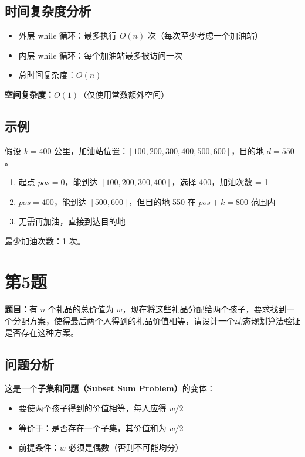 \documentclass[UTF8,12pt,a4paper]{ctexart}
\begin{document}
\subsection*{时间复杂度分析}

\begin{itemize}
	\item 外层 while 循环：最多执行 $O(n)$ 次（每次至少考虑一个加油站）
	\item 内层 while 循环：每个加油站最多被访问一次
	\item 总时间复杂度：$O(n)$
\end{itemize}

\textbf{空间复杂度：}$O(1)$（仅使用常数额外空间）

\subsection*{示例}

假设 $k = 400$ 公里，加油站位置：$[100, 200, 300, 400, 500, 600]$，目的地 $d = 550$。

\begin{enumerate}
	\item 起点 $pos = 0$，能到达 $[100, 200, 300, 400]$，选择 400，加油次数 = 1
	\item $pos = 400$，能到达 $[500, 600]$，但目的地 550 在 $pos + k = 800$ 范围内
	\item 无需再加油，直接到达目的地
\end{enumerate}

最少加油次数：1 次。


\section*{第5题}
\textbf{题目：}有 $n$ 个礼品的总价值为 $w$，现在将这些礼品分配给两个孩子，要求找到一个分配方案，使得最后两个人得到的礼品价值相等，请设计一个动态规划算法验证是否存在这种方案。

\subsection*{问题分析}

这是一个\textbf{子集和问题（Subset Sum Problem）}的变体：
\begin{itemize}
	\item 要使两个孩子得到的价值相等，每人应得 $w/2$
	\item 等价于：是否存在一个子集，其价值和为 $w/2$
	\item 前提条件：$w$ 必须是偶数（否则不可能均分）
\end{itemize}
\end{document}
